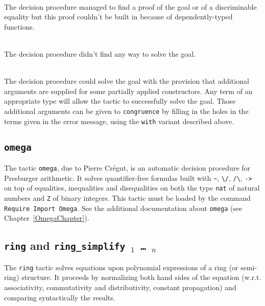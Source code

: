 \begin{ErrMsgs}
  \item {} \\
    The decision procedure managed to find a proof of the goal or of
    a discriminable equality but this proof couldn't be built in {\Coq}
    because of dependently-typed functions.
  \item {} \\
    The decision procedure didn't find any way to solve the goal.
  \item {} \\
    The decision procedure could solve the goal with the provision
    that additional arguments are supplied for some partially applied
    constructors. Any term of an appropriate type will allow the
    tactic to successfully solve the goal. Those additional arguments
    can be given to {\tt congruence} by filling in the holes in the
    terms given in the error message, using the {\tt with} variant
    described above.
\end{ErrMsgs}

\subsection{\tt omega
\label{omega}}

The tactic \texttt{omega}, due to Pierre Cr{\'e}gut,
is an automatic decision procedure for Presburger
arithmetic. It solves quantifier-free 
formulas built with \verb|~|, \verb|\/|, \verb|/\|,
\verb|->| on top of equalities, inequalities and disequalities on
both the type \texttt{nat} of natural numbers and \texttt{Z} of binary
integers. This tactic must be loaded by the command \texttt{Require Import
  Omega}. See the additional documentation about \texttt{omega}
(see Chapter~\ref{OmegaChapter}).

\subsection{{\tt ring} and {\tt ring\_simplify \term$_1$ \dots\ \term$_n$}
}

The {\tt ring} tactic solves equations upon polynomial expressions of
a ring (or semi-ring) structure. It proceeds by normalizing both hand
sides of the equation (w.r.t. associativity, commutativity and
distributivity, constant propagation) and comparing syntactically the
results.

